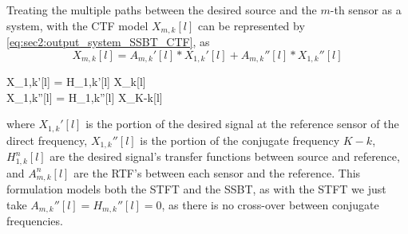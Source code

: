 Treating the multiple paths between the desired source and the $m$-th sensor as a system, with the CTF model $X_{m,k}[l]$ can be represented by \cref{eq:sec2:output_system_SSBT_CTF}, as
\begin{equation}
	\label{eq:sec3:def_ctf_ssbt}
	X_{m,k}[l] = A_{m,k}'[l] \ast X_{1,k}'[l] + A_{m,k}''[l] \ast X_{1,k}''[l]
\end{equation}\vspace*{-2em}
\begin{subgather}
	X_{1,k}'[l] = H_{1,k}'[l] \ast X_k[l] \\
	X_{1,k}''[l] = H_{1,k}''[l] \ast X_{K-k}[l]
\end{subgather}
where $X_{1,k}'[l]$ is the portion of the desired signal at the reference sensor of the direct frequency, $X_{1,k}''[l]$ is the portion of the conjugate frequency $K-k$, $H^n_{1,k}[l]$ are the desired signal's transfer functions between source and reference, and $A^n_{m,k}[l]$ are the RTF's between each sensor and the reference. This formulation models both the STFT and the SSBT, as with the STFT we just take $A_{m,k}''[l] = H_{m,k}''[l] = 0$, as there is no cross-over between conjugate frequencies.

